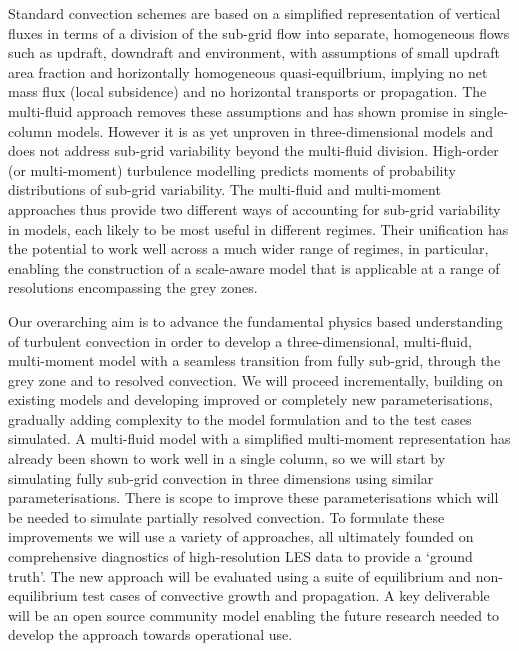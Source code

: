 \documentclass[11pt,a4paper]{article}
\begin{document}
Standard convection schemes are based on a simplified representation of vertical fluxes in terms of a division of the sub-grid flow into separate, homogeneous flows such as updraft, downdraft and environment, with assumptions of small updraft area fraction and horizontally homogeneous quasi-equilbrium, implying no net mass flux (local subsidence) and no horizontal transports or propagation. The multi-fluid approach removes these assumptions and has shown promise in single-column models. However it is as yet unproven in three-dimensional models and does not address sub-grid variability beyond the multi-fluid division. High-order (or multi-moment) turbulence modelling predicts moments of probability distributions of sub-grid variability. The multi-fluid and multi-moment approaches thus provide two different ways of accounting for sub-grid variability in models, each likely to be most useful in different regimes. Their unification has the potential to work well across a much wider range of regimes, in particular, enabling the construction of a scale-aware model that is applicable at a range of resolutions encompassing the grey zones.

Our overarching aim is to advance the fundamental physics based understanding of turbulent convection in order to develop a three-dimensional, multi-fluid, multi-moment model with a seamless transition from fully sub-grid, through the grey zone and to resolved convection. We will proceed incrementally, building on existing models and developing improved or completely new parameterisations, gradually adding complexity to the model formulation and to the test cases simulated.
A multi-fluid model with a simplified multi-moment representation has already been shown to work well in a single column, so we will start by simulating fully sub-grid convection in three dimensions using similar parameterisations.
There is scope to improve these parameterisations which will be needed to simulate partially resolved convection. 
To formulate these improvements we will use a variety of approaches, all ultimately founded on comprehensive diagnostics of high-resolution LES data to provide a `ground truth'.
The new approach will be evaluated using a suite of equilibrium and non-equilibrium test cases of convective growth and propagation. A key deliverable will be an open source community model enabling the future research needed to develop the approach towards operational use.
\end{document}

